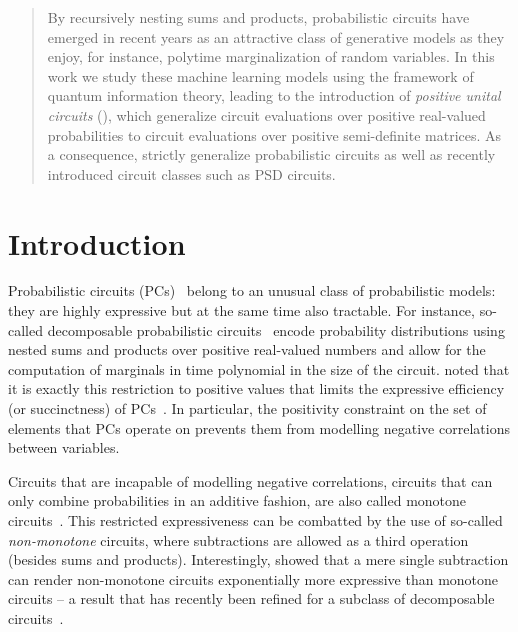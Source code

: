 





\begin{abstract}
	By recursively nesting sums and products, probabilistic circuits have emerged in recent years as an attractive class of generative models as they enjoy, for instance, polytime marginalization of random variables.
	In this work we study these machine learning models using the framework of quantum information theory, leading to the introduction of \textit{positive unital circuits} (\puncs),
	which generalize circuit evaluations over positive real-valued probabilities to circuit evaluations over positive semi-definite matrices.
	As a consequence, \puncs strictly generalize probabilistic circuits as well as recently introduced circuit classes such as PSD circuits.
\end{abstract}




\section{Introduction}



Probabilistic circuits (PCs)~\citep{darwiche2003differential,poon2011sum} belong to an unusual class of probabilistic models: they are highly expressive but at the same time also tractable.
For instance, so-called decomposable probabilistic circuits~\citep{darwiche2001decomposable} encode probability distributions using nested sums and products over positive real-valued numbers and allow for the computation of marginals in time polynomial in the size of the circuit.
\citet{zhang2020relationship} noted that it is exactly this restriction to positive values that limits the expressive efficiency (or succinctness) of PCs~\citep{martens2014expressive,decolnet2021compilation}. In particular, the positivity constraint on the set of elements that PCs operate on prevents them from modelling negative correlations between variables.

Circuits that are incapable of modelling negative correlations, \ie circuits that can only combine probabilities in an additive fashion, are also called monotone circuits~\citep{shpilka2010arithmetic}.
This restricted expressiveness can be combatted by the use of so-called \textit{non-monotone} circuits, where subtractions are allowed as a third operation (besides sums and products). Interestingly, \citet{valiant1979negation} showed that a mere single subtraction can render non-monotone circuits exponentially more expressive than monotone circuits -- a result that has recently been refined for a subclass of decomposable circuits~\citep{loconte2025sum}.

